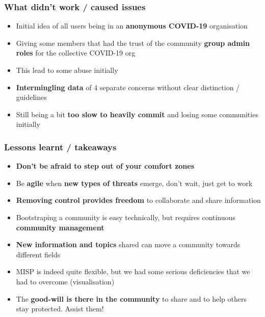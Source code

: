 \begin{frame}
 \frametitle{What didn't work / caused issues}
 \begin{itemize}
         \item Initial idea of all users being in an {\bf anonymous COVID-19} organisation
         \item Giving some members that had the trust of the community {\bf group admin roles} for the collective COVID-19 org
         \item This lead to some abuse initially
         \item {\bf Intermingling data} of 4 separate concerns without clear distinction / guidelines
         \item Still being a bit {\bf too slow to heavily commit} and losing some communities initially
 \end{itemize}
\end{frame}

\begin{frame}
 \frametitle{Lessons learnt / takeaways}
 \begin{itemize}
         \item {\bf Don't be afraid to step out of your comfort zones}
         \item Be {\bf agile} when {\bf new types of threats} emerge, don't wait, just get to work
         \item {\bf Removing control provides freedom} to collaborate and share information
         \item Bootstraping a community is easy technically, but requires continuous {\bf community management}
         \item {\bf New information and topics} shared can move a community towards different fields
         \item MISP is indeed quite flexible, but we had some serious deficiencies that we had to overcome (visualisation)
         \item The {\bf good-will is there in the community} to share and to help others stay protected. Assist them!
 \end{itemize}
\end{frame}


